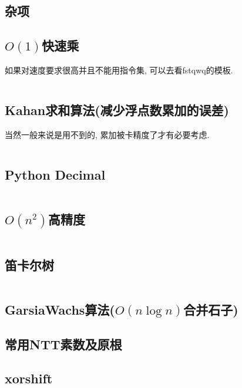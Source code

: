 \documentclass[a4paper, twoside]{article}
\begin{document}
	\begin{multicols}{2}
		\section{杂项}
			\subsection{$O(1)$快速乘}
				如果对速度要求很高并且不能用指令集, 可以去看fstqwq的模板.

				\inputminted{cpp}{../src/misc/O(1)快速乘.cpp}
			
			\subsection{Kahan求和算法(减少浮点数累加的误差)}
				当然一般来说是用不到的, 累加被卡精度了才有必要考虑.
				\inputminted{cpp}{../src/misc/kahan.cpp}
			
			\subsection{Python Decimal}
				\inputminted{python}{../src/misc/decimal.py}
			
			\subsection{$O(n^2)$高精度}
				\inputminted{cpp}{../src/misc/高精度.cpp}
			
			\subsection{笛卡尔树}
				\inputminted{cpp}{../src/misc/笛卡尔树.cpp}
			
			\subsection{GarsiaWachs算法($O(n\log n)$合并石子)}
				
			
			\subsection{常用NTT素数及原根}
				

			\subsection{xorshift}
				\inputminted{cpp}{../src/misc/xorshift.cpp}
			

\end{multicols}
\end{document}
